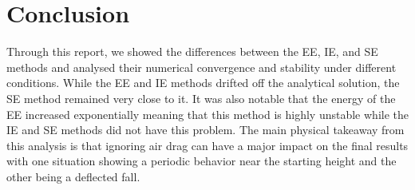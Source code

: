 \section{Conclusion}

Through this report, we showed the differences between the EE, IE, and SE methods and analysed their numerical convergence and stability under different conditions. While the EE and IE methods drifted off the analytical solution, the SE method remained very close to it. It was also notable that the energy of the EE increased exponentially meaning that this method is highly unstable while the IE and SE methods did not have this problem. The main physical takeaway from this analysis is that ignoring air drag can have a major impact on the final results with one situation showing a periodic behavior near the starting height and the other being a deflected fall. 

